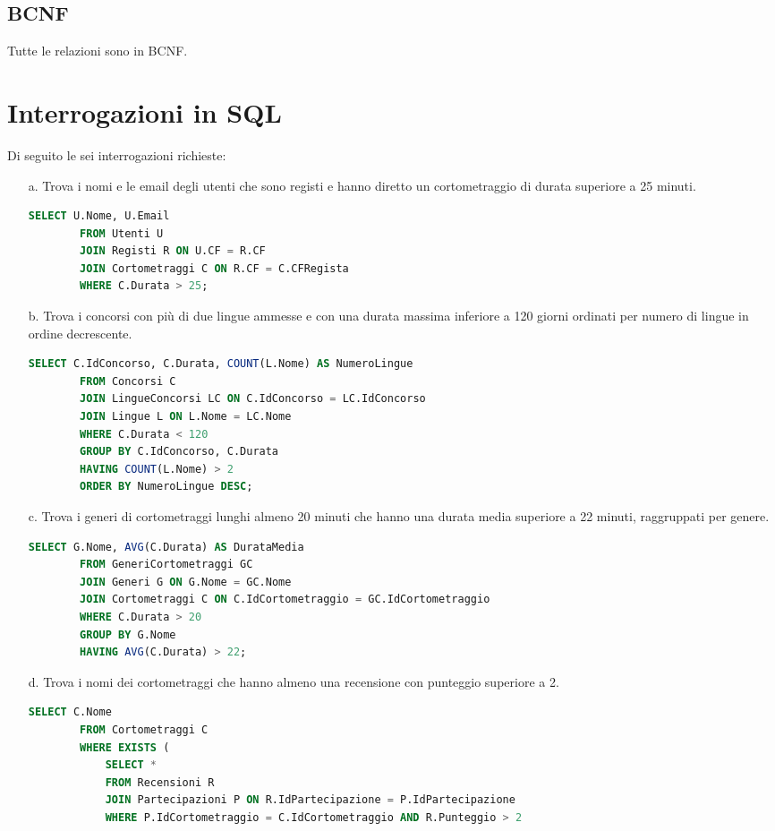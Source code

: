 \subsection{BCNF}
Tutte le relazioni sono in BCNF.

\newpage
\section{Interrogazioni in SQL}
Di seguito le sei interrogazioni richieste:
\begin{enumerate}
	\item[a.] Trova i nomi e le email degli utenti che sono registi e hanno diretto un cortometraggio di durata superiore a 25 minuti.
	\begin{lstlisting}[language=SQL]
		SELECT U.Nome, U.Email
		FROM Utenti U
		JOIN Registi R ON U.CF = R.CF
		JOIN Cortometraggi C ON R.CF = C.CFRegista
		WHERE C.Durata > 25;
	\end{lstlisting}
	\item[b.] Trova i concorsi con più di due lingue ammesse e con una durata massima inferiore a 120 giorni ordinati per numero di lingue in ordine decrescente.
	\begin{lstlisting}[language=SQL]
		SELECT C.IdConcorso, C.Durata, COUNT(L.Nome) AS NumeroLingue
		FROM Concorsi C
		JOIN LingueConcorsi LC ON C.IdConcorso = LC.IdConcorso
		JOIN Lingue L ON L.Nome = LC.Nome
		WHERE C.Durata < 120
		GROUP BY C.IdConcorso, C.Durata
		HAVING COUNT(L.Nome) > 2
		ORDER BY NumeroLingue DESC;
	\end{lstlisting} 
	\item[c.] Trova i generi di cortometraggi lunghi almeno 20 minuti che hanno una durata media superiore a 22 minuti, raggruppati per genere.
	\begin{lstlisting}[language=SQL]
		SELECT G.Nome, AVG(C.Durata) AS DurataMedia
		FROM GeneriCortometraggi GC
		JOIN Generi G ON G.Nome = GC.Nome
		JOIN Cortometraggi C ON C.IdCortometraggio = GC.IdCortometraggio
		WHERE C.Durata > 20
		GROUP BY G.Nome
		HAVING AVG(C.Durata) > 22;
	\end{lstlisting} 
	\item[d.] Trova i nomi dei cortometraggi che hanno almeno una recensione con punteggio superiore a 2.
	\begin{lstlisting}[language=SQL]
		SELECT C.Nome
		FROM Cortometraggi C
		WHERE EXISTS (
			SELECT *
			FROM Recensioni R
			JOIN Partecipazioni P ON R.IdPartecipazione = P.IdPartecipazione
			WHERE P.IdCortometraggio = C.IdCortometraggio AND R.Punteggio > 2

\end{lstlisting}
\end{enumerate}
